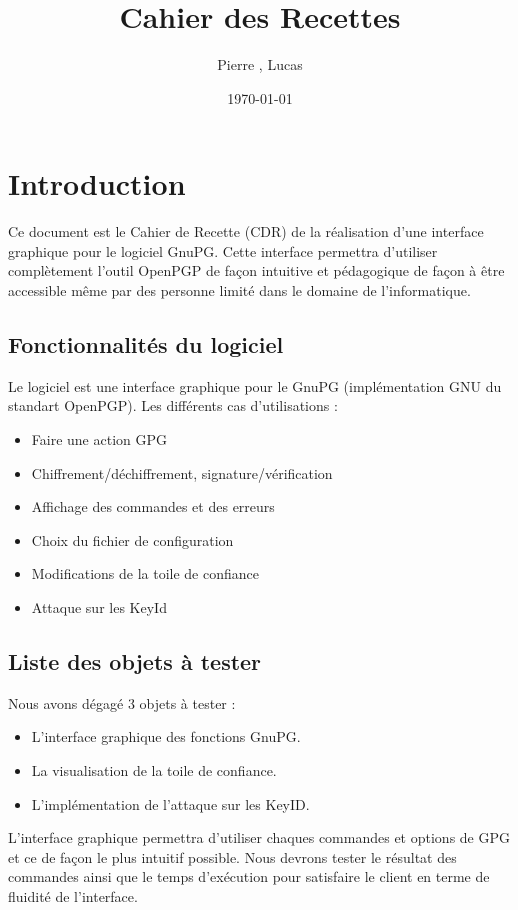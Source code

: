 \documentclass{../res/univ-projet}
\title{Cahier des Recettes}
\author{Pierre \bsc{Balmelle}, Lucas \bsc{Barbay}}
\date{\today}
\begin{document}
\maketitle
\newpage
\tableofcontents
\newpage

\section{Introduction}

Ce document est le Cahier de Recette (CDR) de la réalisation d'une interface graphique pour le logiciel GnuPG.
Cette interface permettra d'utiliser complètement l'outil OpenPGP de façon intuitive et pédagogique de façon 
à être accessible même par des personne limité dans le domaine de l'informatique. 

\subsection{Fonctionnalités du logiciel}
Le logiciel est une interface graphique pour le GnuPG (implémentation GNU du standart OpenPGP).
Les différents cas d'utilisations :
\begin{itemize}
 \item Faire une action GPG
 \item Chiffrement/déchiffrement, signature/vérification
 \item Affichage des commandes et des erreurs
 \item Choix du fichier de configuration
 \item Modifications de la toile de confiance
 \item Attaque sur les KeyId
\end{itemize}

\subsection{Liste des objets à tester}
Nous avons dégagé 3 objets à tester : 
\begin{itemize}
 \item L'interface graphique des fonctions GnuPG.
 \item La visualisation de la toile de confiance.
 \item L'implémentation de l'attaque sur les KeyID. 
\end{itemize}

L'interface graphique permettra d'utiliser chaques commandes et options de GPG et ce de façon le plus intuitif possible. Nous
devrons tester le résultat des commandes ainsi que le temps d'exécution pour satisfaire le client en terme de fluidité de l'interface.
\end{document}

